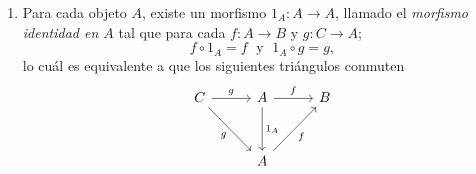 \begin{definicion}
\begin{enumerate}[label=(\arabic*)]
\begin{enumerate}[label=(\alph*),ref=\arabic{enumi}.(\alph*)]
          entonces 
          $$
          h\circ(g\circ f)=(h\circ g)\circ f,
          $$
          lo cuál es equivalente a que el siguiente cuadrado conmute
          \begin{equation*}
              \begin{tikzcd}[column sep=1.2cm,row sep=1.1cm]  
                    A \ar[r,"g\circ f"] \arrow[d, "f"']  & C\ar[d, "h"]\\
                    B \ar[r, "h\circ g"'] & D
                \end{tikzcd}
          \end{equation*}
            \item\label{item:morphism_id} Para cada objeto $A$, existe un morfismo $1_A:A\to A$, llamado el \textit{morfismo identidad en $A$} tal que para cada $f:A\to B$ y $g:C\to A$;
            $$
            f\circ 1_A=f\;\text{ y }\;1_A\circ g=g,
            $$
            lo cuál es equivalente a que los siguientes triángulos conmuten
            \begin{equation*}
                \begin{tikzcd}[column sep=1cm,row sep=1.1cm]  
                    C \arrow[r, "g"] \arrow[dr, "g"'] & A \arrow[d, "1_A"] \ar[r,"f"]& B\\ 
                    & A \ar[ur, "f"']
                \end{tikzcd}
            \end{equation*}
        \end{enumerate}
    \end{enumerate}
\end{definicion}

    

